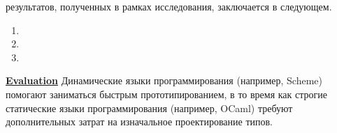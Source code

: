 {\novelty} результатов, полученных в рамках исследования, заключается в следующем.
\begin{enumerate}
  \item 
  \item 
  \item 
\end{enumerate}

{\underline{\textbf{Evaluation}}}
Динамические языки программирования (например, Scheme) помогают заниматься быстрым прототипированием, в то время как строгие статические языки программирования (например, OCaml) требуют дополнительных затрат на изначальное проектирование типов.

